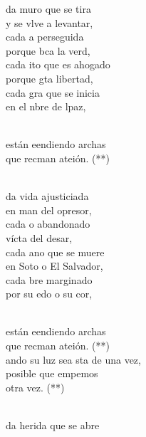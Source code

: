\documentclass[12pt]{article}
\begin{document}
\begin{multicols*}{2}
\begin{cancion}%
	da muro que se tira\\
	y se vlve a levantar,\\
	cada a perseguida \\
	porque bca la verd,\\
	cada ito que es ahogado\\
	porque gta libertad,\\
	cada gra que se inicia\\
	en el nbre de lpaz,\\\jump\\
	\begin{chorus}%
	están eendiendo archas\\
	que recman ateión. (**)\\
	\end{chorus}%
	\jump\\
	da vida ajusticiada\\
	en man del opresor,\\
	cada o abandonado \\
	vícta del desar,\\
	cada ano que se muere\\
	en Soto o El Salvador,\\
	cada bre marginado\\
	por su edo o su cor, \\\jump\\
	\begin{chorus}%
	están eendiendo archas\\
	que recman ateión. (**)\\
\jump
	ando su luz sea sta de una vez,\\
	posible que empemos \\
otra vez. (**)\\
	\end{chorus}%
	\jump\\
	da herida que se abre \\

\end{cancion}
\end{multicols*}
\end{document}

